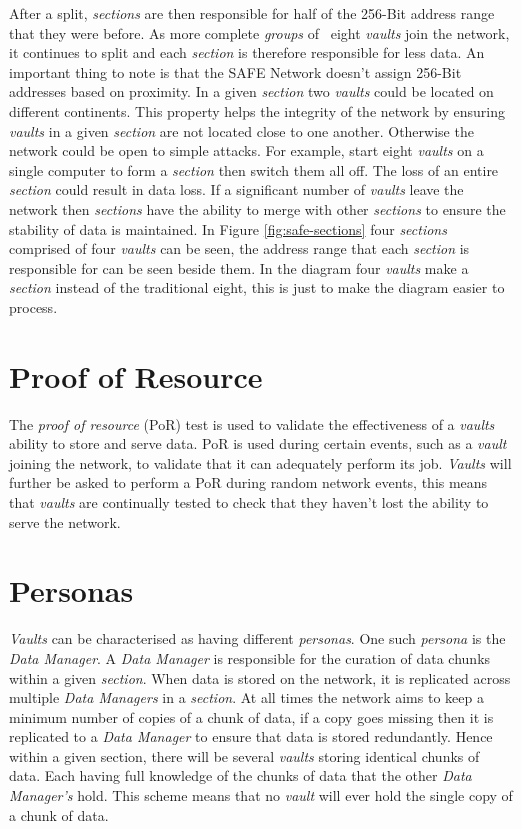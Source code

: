 After a split, \textit{sections} are then responsible for half of the 256-Bit address range that they were before. As more complete \textit{groups} of ~eight \textit{vaults} join the network, it continues to split and each \textit{section} is therefore responsible for less data. An important thing to note is that the SAFE Network doesn't assign 256-Bit addresses based on proximity. In a given \textit{section} two \textit{vaults} could be located on different continents. This property helps the integrity of the network by ensuring \textit{vaults} in a given \textit{section} are not located close to one another. Otherwise the network could be open to simple attacks. For example, start eight \textit{vaults} on a single computer to form a \textit{section} then switch them all off. The loss of an entire \textit{section} could result in data loss. If a significant number of \textit{vaults} leave the network then \textit{sections} have the ability to merge with other \textit{sections} to ensure the stability of data is maintained. In Figure \ref{fig:safe-sections} four \textit{sections} comprised of four \textit{vaults} can be seen, the address range that each \textit{section} is responsible for can be seen beside them. In the diagram four \textit{vaults} make a \textit{section} instead of the traditional eight, this is just to make the diagram easier to process.

\section{Proof of Resource}
\label{subsec:proof-of-resource}

The \textit{proof of resource} (PoR) test is used to validate the effectiveness of a \textit{vaults} ability to store and serve data. PoR is used during certain events, such as a \textit{vault} joining the network, to validate that it can adequately perform its job. \textit{Vaults} will further be asked to perform a PoR during random network events, this means that \textit{vaults} are continually tested to check that they haven't lost the ability to serve the network.

\section{Personas}

\textit{Vaults} can be characterised as having different \textit{personas}. One such \textit{persona} is the \textit{Data Manager}. A \textit{Data Manager} is responsible for the curation of data chunks within a given \textit{section}. When data is stored on the network, it is replicated across multiple \textit{Data Managers} in a \textit{section}. At all times the network aims to keep a minimum number of copies of a chunk of data, if a copy goes missing then it is replicated to a \textit{Data Manager} to ensure that data is stored redundantly. Hence within a given section, there will be several \textit{vaults} storing identical chunks of data. Each having full knowledge of the chunks of data that the other \textit{Data Manager's} hold. This scheme means that no \textit{vault} will ever hold the single copy of a chunk of data.

